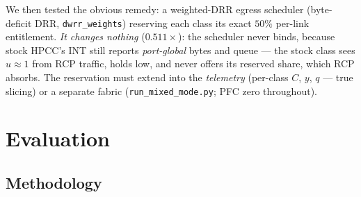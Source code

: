 \documentclass[conference]{IEEEtran}
\begin{document}
We then tested the obvious remedy: a weighted-DRR egress scheduler (byte-deficit DRR,
\texttt{dwrr\_weights}) reserving each class its exact $50\%$ per-link entitlement. \emph{It changes nothing} ($0.511\times$): the scheduler
never binds, because stock HPCC's INT still reports \emph{port-global} bytes and queue --- the
stock class sees $u \approx 1$ from RCP traffic, holds low, and never offers its reserved
share, which RCP absorbs. The reservation must extend into the \emph{telemetry} (per-class
$C$, $y$, $q$ --- true slicing) or a separate fabric (\texttt{run\_mixed\_mode.py}; PFC
zero throughout).

\section{Evaluation}
\label{sec:eval}

\subsection{Methodology}
\end{document}
